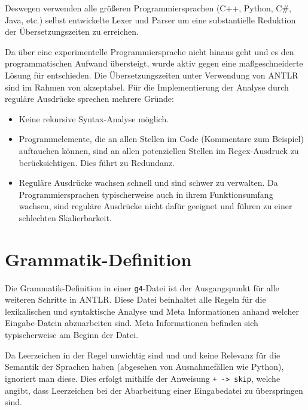 Deswegen verwenden alle größeren Programmiersprachen (C++, Python, C\#, Java, etc.) selbst entwickelte Lexer und Parser um eine substantielle Reduktion der Übersetzungszeiten zu erreichen.

Da \toya über eine experimentelle Programmiersprache nicht hinaus geht und es den programmatischen Aufwand übersteigt, wurde aktiv gegen eine maßgeschneiderte Lösung für \toya entschieden. Die Übersetzungszeiten unter Verwendung von ANTLR sind im Rahmen von \toya akzeptabel. Für die Implementierung der Analyse durch reguläre Ausdrücke sprechen mehrere Gründe:
\begin{itemize}
    \item Keine rekursive Syntax-Analyse möglich.
    \item Programmelemente, die an allen Stellen im Code (Kommentare zum Beispiel) auftauchen können, sind an allen potenziellen Stellen im Regex-Ausdruck zu berücksichtigen. Dies führt zu Redundanz.
    \item Reguläre Ausdrücke wachsen schnell und sind schwer zu verwalten. Da Programmiersprachen typischerweise auch in ihrem Funktionsumfang wachsen, sind reguläre Ausdrücke nicht dafür geeignet und führen zu einer schlechten Skalierbarkeit.
\end{itemize}


\section{Grammatik-Definition}

Die Grammatik-Definition in einer \texttt{g4}-Datei ist der Ausgangspunkt für alle weiteren Schritte in ANTLR. Diese Datei beinhaltet alle Regeln für die lexikalischen und syntaktische Analyse und Meta Informationen anhand welcher Eingabe-Datein abzuarbeiten sind. Meta Informationen befinden sich typischerweise am Beginn der Datei.

Da Leerzeichen in der Regel unwichtig sind und und keine Relevanz für die Semantik der Sprachen haben (abgesehen von Ausnahmefällen wie Python), ignoriert man diese. Dies erfolgt mithilfe der Anweisung \texttt{+ -> skip}, welche angibt, dass Leerzeichen bei der Abarbeitung einer Eingabedatei zu überspringen sind.

